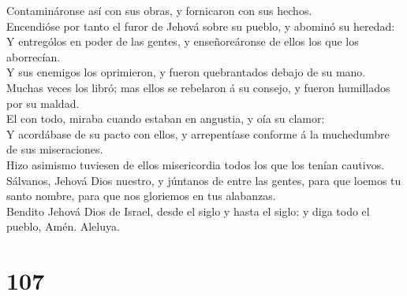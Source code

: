  Contamináronse así con sus obras, y fornicaron con sus
hechos.\\
 Encendióse por tanto el furor de Jehová sobre su pueblo, y
abominó su heredad:\\
 Y entrególos en poder de las gentes, y enseñoreáronse de
ellos los que los aborrecían.\\
 Y sus enemigos los oprimieron, y fueron quebrantados
debajo de su mano.\\
 Muchas veces los libró; mas ellos se rebelaron á su
consejo, y fueron humillados por su maldad.\\
 El con todo, miraba cuando estaban en angustia, y oía su
clamor:\\
 Y acordábase de su pacto con ellos, y arrepentíase
conforme á la muchedumbre de sus miseraciones.\\
 Hizo asimismo tuviesen de ellos misericordia todos los que
los tenían cautivos.\\
 Sálvanos, Jehová Dios nuestro, y júntanos de entre las
gentes, para que loemos tu santo nombre, para que nos gloriemos en tus
alabanzas.\\
 Bendito Jehová Dios de Israel, desde el siglo y hasta el
siglo: y diga todo el pueblo, Amén. Aleluya.

\hypertarget{section-106}{%
\section{107}\label{section-106}}

